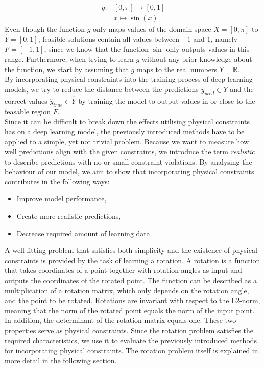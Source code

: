 \begin{equation}
\label{example_fn}
\begin{aligned}
g: &[0, \pi] \to [0, 1]\\
&x \mapsto \sin(x)
\end{aligned}
\end{equation}
Even though the function $g$ only maps values of the domain space $X = [0, \pi]$ to $\hat{Y} = [0, 1]$, feasible solutions contain all values between $-1$ and $1$, namely $F = [-1, 1]$, since we know that the function $\sin$ only outputs values in this range. Furthermore, when trying to learn $g$ without any prior knowledge about the function, we start by assuming that $g$ maps to the real numbers $Y = \mathbb{R}$.\\
\indent By incorporating physical constraints into the training process of deep learning models, we try to reduce the distance between the predictions $y_{pred} \in Y$ and the correct values $\hat{y}_{true} \in \hat{Y}$ by training the model to output values in or close to the feasable region $F$.\\
\indent Since it can be difficult to break down the effects utilising physical constraints has on a deep learning model, the previously introduced methods have to be applied to a simple, yet not trivial problem. Because we want to measure how well predictions align with the given constraints, we introduce the term \textit{realistic} to describe predictions with no or small constraint violations. By analysing the behaviour of our model, we aim to show that incorporating physical constraints contributes in the following ways:
\begin{itemize}
	\item Improve model performance,
	\item Create more realistic predictions,
	\item Decrease required amount of learning data.
\end{itemize}
A well fitting problem that satisfies both simplicity and the existence of physical constraints is provided by the task of learning a rotation. A rotation is a function that takes coordinates of a point together with rotation angles as input and outputs the coordinates of the rotated point.  The function can be described as a multiplication of a rotation matrix, which only depends on the rotation angle, and the point to be rotated. Rotations are invariant with respect to the L2-norm, meaning that the norm of the rotated point equals the norm of the input point. In addition, the determinant of the rotation matrix equals one. These two properties serve as physical constraints. Since the rotation problem satisfies the required characteristics, we use it to evaluate the previously introduced methods for incorporating physical constraints. The rotation problem itself is explained in more detail in the following section.

